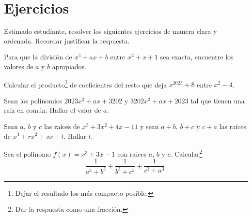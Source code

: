 \section*{\large Ejercicios}

Estimado estudiante, resolver los siguientes ejercicios de manera clara y ordenada. Recordar justificar la respuesta.

\begin{exercise}
    Para que la división de $x^5 + ax + b$ entre $x^2 + x + 1$ sea exacta, encuentre los valores de $a$ y $b$ apropiados.
\end{exercise}

\begin{exercise}
    Calcular el producto\footnote{Dejar el resultado los más compacto posible.} de coeficientes del resto que deja $x^{2023} + 8$ entre $x^2 - 4$.
\end{exercise}

\begin{exercise}
    Sean los polinomios $2023x^2 + ax + 3202$ y $3202x^2 + ax + 2023$ tal que tienen una raíz en común.
    Hallar el valor de $a$.
\end{exercise}

\begin{exercise}
    Sean $a$, $b$ y $c$ las raíces de $x^3 + 3x^2 + 4x - 11$ y sean $a + b$, $b + c$ y $c + a$ las raíces de $x^3 + rx^2 + sx + t$.
    Hallar $t$.
\end{exercise}

\begin{exercise}
    Sea el polinomo $f(x) = x^3 + 3x - 1$ con raíces $a$, $b$ y $c$.
    Calcular\footnote{Dar la respuesta como una fracción.}
    \[\frac{1}{a^3 + b^3} + \frac{1}{b^3 + c^3} + \frac{1}{c^3 + a^3}.\]
\end{exercise}

%